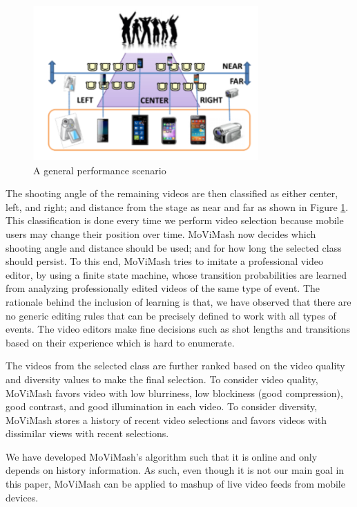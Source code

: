 \documentclass{sig-alternate}
\begin{document}
\begin{figure}
    \centering
    \includegraphics{img1.png}
    \caption{A general performance scenario}
    \label{fig:fig1}
\end{figure}

The shooting angle of the remaining videos are then classified as
either center, left, and right; and distance from the stage as near and far as shown in Figure \ref{fig:fig1}. This classification is done every time we perform video selection because mobile users may change their position over time. MoViMash now decides which shooting angle and distance should be used; and for how long the selected class should persist. To this end, MoViMash tries to imitate a professional video editor, by using a finite state machine, whose transition probabilities are learned from analyzing professionally edited videos of the same type of event. The rationale behind the inclusion of learning
is that, we have observed that there are no generic editing rules
that can be precisely defined to work with all types of events. The
video editors make fine decisions such as shot lengths and transitions
based on their experience which is hard to enumerate.

The videos from the selected class are further ranked based on
the video quality and diversity values to make the final selection.
To consider video quality, MoViMash favors video with low blurriness,
low blockiness (good compression), good contrast, and good
illumination in each video. To consider diversity, MoViMash stores
a history of recent video selections and favors videos with dissimilar
views with recent selections.

We have developed MoViMash's algorithm such that it is online
and only depends on history information. As such, even though
it is not our main goal in this paper, MoViMash can be applied to
mashup of live video feeds from mobile devices.
\end{document}
